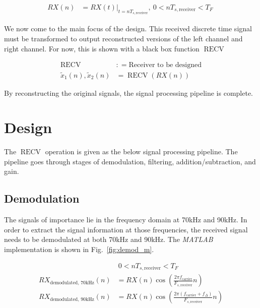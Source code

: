 \documentclass[journal]{IEEEtran}
\newcommand{\eqdef}{\mathrel{:\mathop=}}
\begin{document}
\begin{align*}
    RX( n) & =RX( t)\Bigr|_{t=nT_{s,\text{receiver}}} ,\ 0< nT_{s,\text{receiver}} < T_{F} \
\end{align*}

We now come to the main focus of the design. This received discrete time signal must be transformed
to output reconstructed versions of the left channel and right channel. For now, this is shown with
a black box function \(\operatorname{RECV}\)

\begin{align*}
    \operatorname{RECV}                  & \eqdef \text{Receiver to be designed}    \\
    \tilde{x}_{1}( n) ,\tilde{x}_{2}( n) & =\operatorname{RECV}\left( RX( n)\right)
\end{align*}

By reconstructing the original signals, the signal processing pipeline is complete.

\section{Design}

The \(\displaystyle \operatorname{RECV}\) operation is given as the below signal
processing pipeline. The pipeline goes through stages of demodulation,
filtering, addition/subtraction, and gain.

\subsection{Demodulation}

The signals of importance lie in the frequency domain at 70kHz and 90kHz. In
order to extract the signal information at those frequencies, the received signal needs to be
demodulated at both 70kHz and 90kHz. The \emph{MATLAB} implementation is shown in Fig.\ \ref{fig:demod_m}.



\begin{align*}
                                       & \ 0< nT_{s,\text{receiver}} < T_{F}                                                             \\
    RX_{\text{demodulated, 70kHz}}( n) & =RX( n)\cos\left(\frac{2\pi f_{\text{carrier}}}{F_{s,\text{receiver}}} n\right)                 \\
    RX_{\text{demodulated, 90kHz}}( n) & =RX( n)\cos\left(\frac{2\pi ( f_{\text{carrier}} +f_{\Delta })}{F_{s,\text{receiver}}} n\right)
\end{align*}
\end{document}
